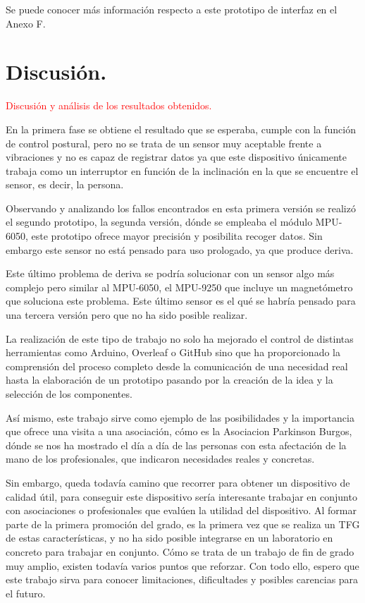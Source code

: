 Se puede conocer más información respecto a este prototipo de interfaz en el Anexo F.


\section{Discusión.}
\textcolor{red}{Discusión y análisis de los resultados obtenidos.}

En la primera fase se obtiene el resultado que se esperaba, cumple con la función de control postural, pero no se trata de un sensor muy aceptable frente a vibraciones y no es capaz de registrar datos ya que este dispositivo únicamente trabaja como un interruptor en función de la inclinación en la que se encuentre el sensor, es decir, la persona.

Observando y analizando los fallos encontrados en esta primera versión se realizó el segundo prototipo, la segunda versión, dónde se empleaba el módulo MPU-6050\cite{MPU6050_1,MPU6050_2}, este prototipo ofrece mayor precisión y posibilita recoger datos. Sin embargo este sensor no está pensado para uso prologado, ya que produce deriva.

Este último problema de deriva se podría solucionar con un sensor algo más complejo pero similar al MPU-6050, el MPU-9250\cite{MPU9250_1,MPU9250_2} que incluye un magnetómetro que soluciona este problema. Este último sensor es el qué se habría pensado para una tercera versión pero que no ha sido posible realizar.

La realización de este tipo de trabajo no solo ha mejorado el control de distintas herramientas como Arduino, Overleaf o GitHub sino que ha proporcionado la comprensión del proceso completo desde la comunicación de una necesidad real hasta la elaboración de un prototipo pasando por la creación de la idea y la selección de los componentes.

Así mismo, este trabajo sirve como ejemplo de las posibilidades y la importancia que ofrece una visita a una asociación, cómo es la Asociacion Parkinson Burgos\cite{ParkinsonBurgos}, dónde se nos ha mostrado el día a día de las personas con esta afectación de la mano de los profesionales, que indicaron necesidades reales y concretas. 

Sin embargo, queda todavía camino que recorrer para obtener un dispositivo de calidad útil, para conseguir este dispositivo sería interesante trabajar en conjunto con asociaciones o profesionales que evalúen la utilidad del dispositivo. Al formar parte de la primera promoción del grado, es la primera vez que se realiza un TFG de estas características, y no ha sido posible integrarse en un laboratorio en concreto para trabajar en conjunto. Cómo se trata de un trabajo de fin de grado muy amplio, existen todavía varios puntos que reforzar. Con todo ello, espero que este trabajo sirva para conocer limitaciones, dificultades y posibles carencias para el futuro.



